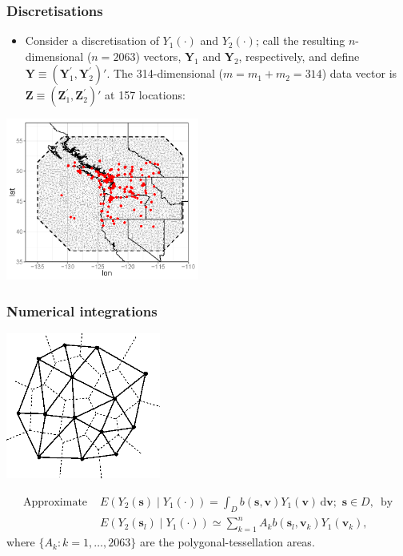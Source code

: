 \documentclass{beamer}
\newcommand{\svec} {\textbf{s}}
\newcommand{\s}{\mathbf{s}}
\renewcommand{\v}{\mathbf{v}}
\renewcommand{\d}{\mathrm{d}}
\newcommand{\Yvec}{\mathbf{Y}}
\newcommand{\Zvec}{\mathbf{Z}}
\newcommand{\E}{E}
\begin{document}
\begin{frame}
\frametitle{Discretisations}
\begin{itemize}
\item Consider a discretisation of $Y_1(\cdot)$ and $Y_2(\cdot)$; call the resulting $n$-dimensional ($n=2063$) vectors, $\Yvec_1$ and $\Yvec_2$, respectively, and define $\Yvec \equiv (\Yvec_1^{\prime},\Yvec_2^{\prime})'$. The 314-dimensional ($m=m_1+m_2=314$) data vector is $\Zvec \equiv (\Zvec_1^{\prime},\Zvec_2^{\prime})'$ at 157 locations:
\end{itemize}

\vspace{-0.15in}
\begin{center}
\includegraphics[width=2.5in]{meshplot2.png}
\end{center}

\end{frame}



\begin{frame}
\frametitle{Numerical integrations}

\vspace{-.8cm}
\begin{center}
\includegraphics[width=2in]{vor3.png}
\end{center}
\vspace{-.5cm}
\begin{align*}
\mbox{Approximate }&\displaystyle \E\left(Y_2(\s)\mid Y_1(\cdot)\right)=\int_D{b(\s,\v)Y_1(\v)\,\d \v};\,\,\s\in D,\,\mbox{ by}\\
&\E(Y_2(\svec_l) \mid  Y_1(\cdot)) \simeq \sum_{k=1}^{n} A_k b(\svec_l,\v_k)Y_1(\v_k),
\end{align*}
where $\{A_k:k=1,\ldots,2063\}$ are the polygonal-tessellation areas.
\end{frame}
\end{document}
